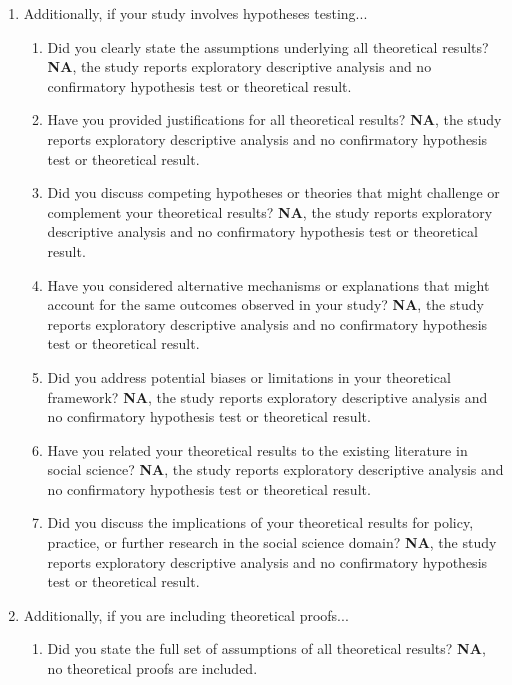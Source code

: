 \begin{enumerate}
\begin{enumerate}
\item Have you read the ethics review guidelines and ensured that your paper conforms to them? \textbf{No}, because human authors have not yet certified conformity or an institutional determination; this is a working draft.
\end{enumerate}
\item Additionally, if your study involves hypotheses testing...
\begin{enumerate}
\item Did you clearly state the assumptions underlying all theoretical results? \textbf{NA}, the study reports exploratory descriptive analysis and no confirmatory hypothesis test or theoretical result.
\item Have you provided justifications for all theoretical results? \textbf{NA}, the study reports exploratory descriptive analysis and no confirmatory hypothesis test or theoretical result.
\item Did you discuss competing hypotheses or theories that might challenge or complement your theoretical results? \textbf{NA}, the study reports exploratory descriptive analysis and no confirmatory hypothesis test or theoretical result.
\item Have you considered alternative mechanisms or explanations that might account for the same outcomes observed in your study? \textbf{NA}, the study reports exploratory descriptive analysis and no confirmatory hypothesis test or theoretical result.
\item Did you address potential biases or limitations in your theoretical framework? \textbf{NA}, the study reports exploratory descriptive analysis and no confirmatory hypothesis test or theoretical result.
\item Have you related your theoretical results to the existing literature in social science? \textbf{NA}, the study reports exploratory descriptive analysis and no confirmatory hypothesis test or theoretical result.
\item Did you discuss the implications of your theoretical results for policy, practice, or further research in the social science domain? \textbf{NA}, the study reports exploratory descriptive analysis and no confirmatory hypothesis test or theoretical result.
\end{enumerate}
\item Additionally, if you are including theoretical proofs...
\begin{enumerate}
\item Did you state the full set of assumptions of all theoretical results? \textbf{NA}, no theoretical proofs are included.

\end{enumerate}
\end{enumerate}
